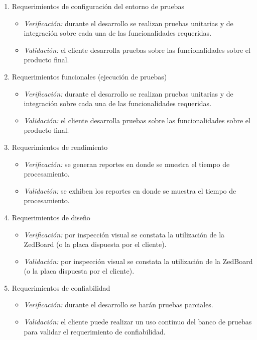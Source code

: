 \documentclass[
11pt, %
]{charter}
\begin{document}
\begin{enumerate}
	\item Requerimientos de configuración del entorno de pruebas
	\begin{itemize}
		\item \emph{Verificación:} durante el desarrollo se realizan pruebas unitarias y de integración sobre cada una de las funcionalidades requeridas.
		\item \emph{Validación:} el cliente desarrolla pruebas sobre las funcionalidades sobre el producto final.
	\end{itemize}
		
	\item Requerimientos funcionales (ejecución de pruebas)
	\begin{itemize}
		\item \emph{Verificación:} durante el desarrollo se realizan pruebas unitarias y de integración sobre cada una de las funcionalidades requeridas.
		\item \emph{Validación:} el cliente desarrolla pruebas sobre las funcionalidades sobre el producto final.
	\end{itemize}

	\item Requerimientos de rendimiento
	\begin{itemize}
		\item \emph{Verificación:} se generan reportes en donde se muestra el tiempo de procesamiento.
		\item \emph{Validación:} se exhiben los reportes en donde se muestra el tiempo de procesamiento.
	\end{itemize}

	\item Requerimientos de diseño
	\begin{itemize}
		\item \emph{Verificación:} por inspección visual se constata la utilización de la ZedBoard (o la placa dispuesta por el cliente). 
		\item \emph{Validación:} por inspección visual se constata la utilización de la ZedBoard (o la placa dispuesta por el cliente). 
	\end{itemize}

	\item Requerimientos de confiabilidad 
	\begin{itemize}
		\item \emph{Verificación:} durante el desarrollo se harán pruebas parciales. 
		\item \emph{Validación:} el cliente puede realizar un uso continuo del banco de pruebas para validar el requerimiento de confiabilidad.
	\end{itemize}


\end{enumerate}
\end{document}
